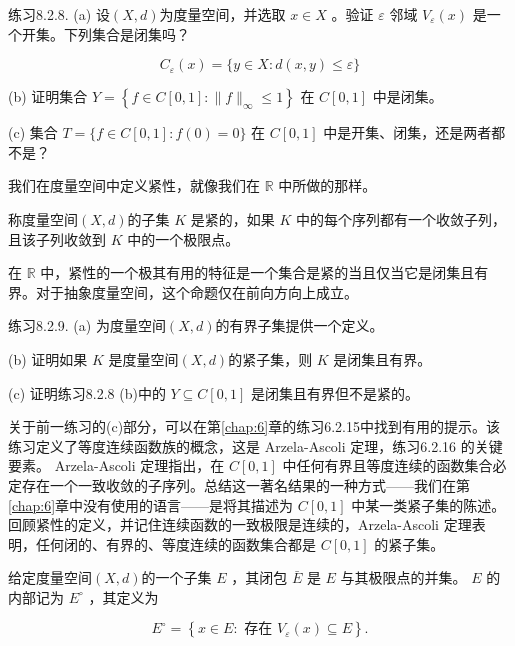 练习8.2.8. (a) 设$(X, d)$为度量空间，并选取 \(x \in  X\) 。验证 \(\varepsilon\) 邻域 \({V}_{\varepsilon }\left( x\right)\) 是一个开集。下列集合是闭集吗？

\[
{C}_{\varepsilon }\left( x\right)  = \{ y \in  X : d\left( {x,y}\right)  \leq  \varepsilon \}
\]


(b) 证明集合 \(Y = \left\{  {f \in  C\left\lbrack  {0,1}\right\rbrack   : \parallel f{\parallel }_{\infty } \leq  1}\right\}\) 在 \(C\left\lbrack  {0,1}\right\rbrack\) 中是闭集。

(c) 集合 \(T = \{ f \in  C\left\lbrack  {0,1}\right\rbrack   : f\left( 0\right)  = 0\}\) 在 \(C\left\lbrack  {0,1}\right\rbrack\) 中是开集、闭集，还是两者都不是？

我们在度量空间中定义紧性，就像我们在 \(\mathbb{R}\) 中所做的那样。

\begin{Def}
  \label{def:8.2.7}
  称度量空间$(X, d)$的子集 \(K\) 是紧的，如果 \(K\) 中的每个序列都有一个收敛子列，且该子列收敛到 \(K\) 中的一个极限点。
\end{Def}

在 \(\mathbb{R}\) 中，紧性的一个极其有用的特征是一个集合是紧的当且仅当它是闭集且有界。对于抽象度量空间，这个命题仅在前向方向上成立。

练习8.2.9. (a) 为度量空间$(X, d)$的有界子集提供一个定义。

(b) 证明如果 \(K\) 是度量空间$(X, d)$的紧子集，则 \(K\) 是闭集且有界。

(c) 证明练习8.2.8 (b)中的 \(Y \subseteq  C\left\lbrack  {0,1}\right\rbrack\) 是闭集且有界但不是紧的。

关于前一练习的(c)部分，可以在第\ref{chap:6}章的练习6.2.15中找到有用的提示。该练习定义了等度连续函数族的概念，这是 Arzela-Ascoli 定理，练习6.2.16 的关键要素。 Arzela-Ascoli 定理指出，在 \(C\left\lbrack  {0,1}\right\rbrack\) 中任何有界且等度连续的函数集合必定存在一个一致收敛的子序列。总结这一著名结果的一种方式——我们在第\ref{chap:6}章中没有使用的语言——是将其描述为 \(C\left\lbrack  {0,1}\right\rbrack\) 中某一类紧子集的陈述。回顾紧性的定义，并记住连续函数的一致极限是连续的，Arzela-Ascoli 定理表明，任何闭的、有界的、等度连续的函数集合都是 \(C\left\lbrack  {0,1}\right\rbrack\) 的紧子集。

\begin{Def}
  \label{def:8.2.8}
  给定度量空间$(X, d)$的一个子集 \(E\) ，其闭包 \(\bar{E}\) 是 \(E\) 与其极限点的并集。 \(E\) 的内部记为 \({E}^{ \circ  }\) ，其定义为

\[
{E}^{ \circ  } = \left\{  {x \in  E : \text{ 存在 }{V}_{\varepsilon }\left( x\right)  \subseteq  E}\right\}  .
\]
\end{Def}

